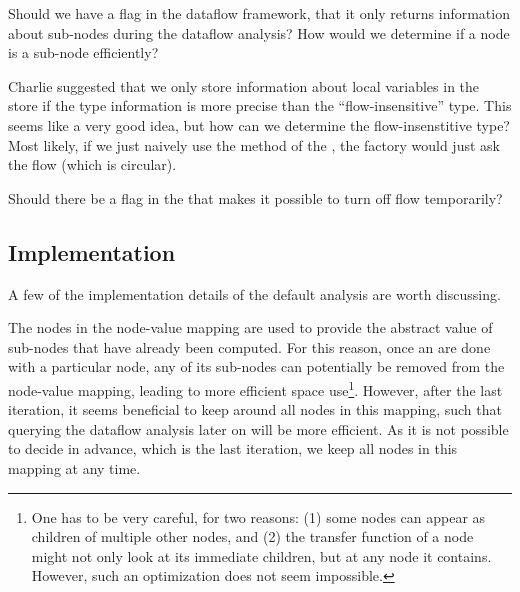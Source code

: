 \begin{new}
\begin{workinprogress}
    Should we have a flag in the dataflow framework, that it only returns information
    about sub-nodes during the dataflow analysis?  How would we determine if a node is
    a sub-node efficiently?
\end{workinprogress}

\begin{workinprogress}
    Charlie suggested that we only store information about local variables in the store if
    the type information is more precise than the ``flow-insensitive'' type.  This seems like
    a very good idea, but how can we determine the flow-insenstitive type?  Most likely, if we
    just naively use the  method of the , the
    factory would just ask the flow (which is circular).
    
    Should there be a flag in the  that makes it possible to turn off
    flow temporarily?
\end{workinprogress}

\end{new}



\subsection{Implementation}

A few of the implementation details of the default analysis are worth discussing.


\begin{new}
The nodes in the node-value mapping are used to provide the abstract value of sub-nodes
that have already been computed.  For this reason, once an are done with a particular node,
any of its sub-nodes can potentially be removed from the node-value mapping,
leading to more efficient space use\footnote{One has to be very careful, for two reasons: (1)
some nodes can appear as children of multiple other nodes, and (2) the transfer function of
a node might not only look at its immediate children, but at any node it contains.  However,
such an optimization does not seem impossible.}.
However, after the last iteration, it seems beneficial to keep around all nodes in this mapping,
such that querying the dataflow analysis later on will be more efficient.  As it is not
possible to decide in advance, which is the last iteration, we keep all nodes in this mapping
at any time.
\end{new}

